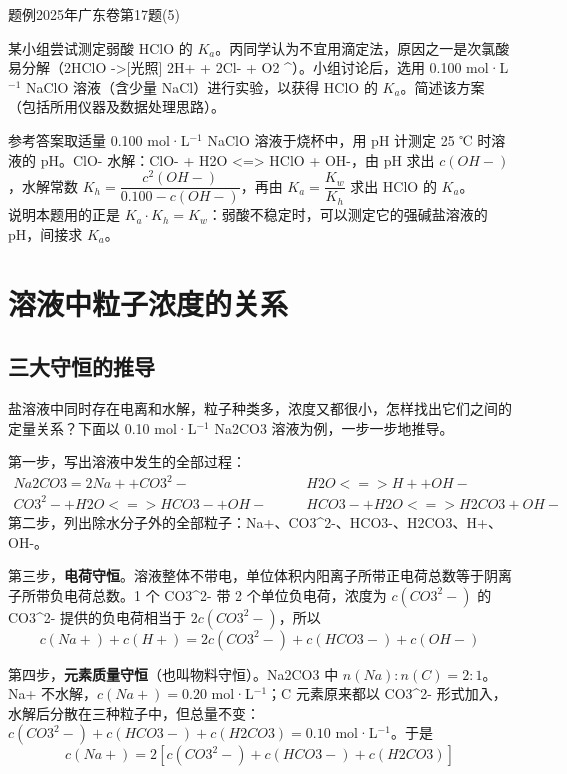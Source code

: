 \documentclass[UTF8,a4paper,zihao=5,oneside,openany,fontset=none]{ctexbook}
\def\heiti{\CJKfamily{zhhei}}
\def\mathrm#1{#1}\def\text#1{#1}\def\ensuremath#1{#1}\def\ce#1{#1}%
\newenvironment{zhenti}[1]{\par\addvspace{.7em}\Needspace{5\baselineskip}\color{black}\noindent
 {\heiti 题例\quad}{\small #1}\par\nobreak\smallskip\nobreak\ignorespaces}{\par\addvspace{.6em}}
\newcommand{\dianbo}{{\heiti 说明\quad}}
\begin{document}
\begin{zhenti}{2025年广东卷第17题(5)}
某小组尝试测定弱酸 HClO 的 $K_\text{a}$。丙同学认为不宜用滴定法，原因之一是次氯酸易分解（\ce{2HClO ->[\text{光照}] 2H+ + 2Cl- + O2 ^}）。小组讨论后，选用 0.100 mol·L$^{-1}$ NaClO 溶液（含少量 NaCl）进行实验，以获得 HClO 的 $K_\text{a}$。简述该方案（包括所用仪器及数据处理思路）。

{\heiti 参考答案}\quad 取适量 0.100 mol·L$^{-1}$ NaClO 溶液于烧杯中，用 pH 计测定 25 ℃ 时溶液的 pH。\ce{ClO-} 水解：\ce{ClO- + H2O <=> HClO + OH-}，由 pH 求出 $c(\ce{OH-})$，水解常数 $K_\text{h}=\dfrac{c^2(\ce{OH-})}{0.100-c(\ce{OH-})}$，再由 $K_\text{a}=\dfrac{K_\text{w}}{K_\text{h}}$ 求出 HClO 的 $K_\text{a}$。\\
\dianbo 本题用的正是 $K_\text{a}\cdot K_\text{h}=K_\text{w}$：弱酸不稳定时，可以测定它的强碱盐溶液的 pH，间接求 $K_\text{a}$。
\end{zhenti}

\section{溶液中粒子浓度的关系}

\subsection{三大守恒的推导}
盐溶液中同时存在电离和水解，粒子种类多，浓度又都很小，怎样找出它们之间的定量关系？下面以 0.10 mol·L$^{-1}$ \ce{Na2CO3} 溶液为例，一步一步地推导。

第一步，写出溶液中发生的全部过程：
\[\begin{aligned}
\ce{Na2CO3 = 2Na+ + CO3^2-}&\qquad \ce{H2O <=> H+ + OH-}\\
\ce{CO3^2- + H2O <=> HCO3- + OH-}&\qquad \ce{HCO3- + H2O <=> H2CO3 + OH-}
\end{aligned}\]
第二步，列出除水分子外的全部粒子：\ce{Na+}、\ce{CO3^2-}、\ce{HCO3-}、\ce{H2CO3}、\ce{H+}、\ce{OH-}。

第三步，\textbf{电荷守恒}。溶液整体不带电，单位体积内阳离子所带正电荷总数等于阴离子所带负电荷总数。1 个 \ce{CO3^2-} 带 2 个单位负电荷，浓度为 $c(\ce{CO3^2-})$ 的 \ce{CO3^2-} 提供的负电荷相当于 $2c(\ce{CO3^2-})$，所以
\[c(\ce{Na+})+c(\ce{H+})=2c(\ce{CO3^2-})+c(\ce{HCO3-})+c(\ce{OH-})\]

第四步，\textbf{元素质量守恒}（也叫物料守恒）。\ce{Na2CO3} 中 $n(\mathrm{Na}):n(\mathrm{C})=2:1$。\ce{Na+} 不水解，$c(\ce{Na+})=0.20$ mol·L$^{-1}$；C 元素原来都以 \ce{CO3^2-} 形式加入，水解后分散在三种粒子中，但总量不变：$c(\ce{CO3^2-})+c(\ce{HCO3-})+c(\ce{H2CO3})=0.10$ mol·L$^{-1}$。于是
\[c(\ce{Na+})=2[c(\ce{CO3^2-})+c(\ce{HCO3-})+c(\ce{H2CO3})]\]
\end{document}
